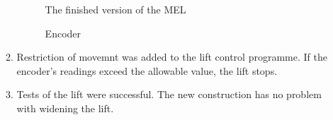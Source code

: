 \begin{enumerate}
\begin{enumerate}
		\begin{figure}[H]
			\begin{minipage}[h]{0.47\linewidth}
				\caption{The finished version of the MEL}
			\end{minipage}
			\hfill
			\begin{minipage}[h]{0.47\linewidth}
				\caption{Encoder}
			\end{minipage}
		\end{figure}
		
		\item Restriction of movemnt was added to the lift control programme. If the encoder's readings exceed the allowable value, the lift stops.
		
		\item Tests of the lift were successful. The new construction has no problem with widening the lift.
		

\end{enumerate}
\end{enumerate}

